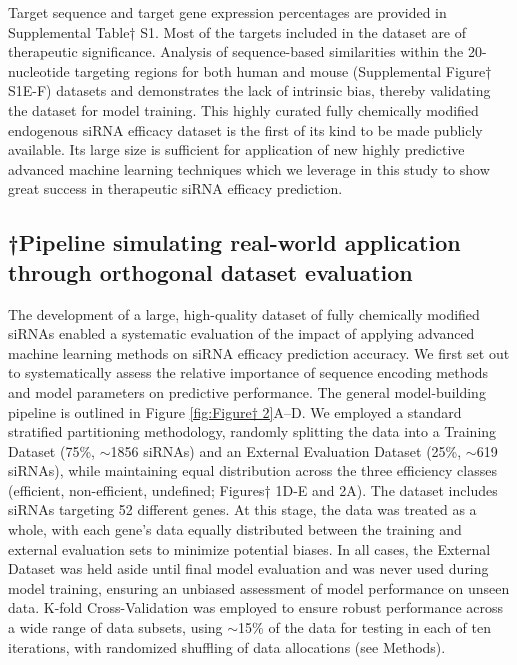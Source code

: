 \documentclass{report}
\begin{document}
Target sequence and target gene expression percentages are provided in Supplemental Table† S1. Most of the targets included in the dataset are of therapeutic significance. Analysis of sequence-based similarities within the 20-nucleotide targeting regions for both human and mouse (Supplemental Figure† S1E-F) datasets and demonstrates the lack of intrinsic bias, thereby validating the dataset for model training. This highly curated fully chemically modified endogenous siRNA efficacy dataset is the first of its kind to be made publicly available. Its large size is sufficient for application of new highly predictive advanced machine learning techniques which we leverage in this study to show great success in therapeutic siRNA efficacy prediction.


\subsection{†Pipeline simulating real-world application through orthogonal dataset evaluation}

The development of a large, high-quality dataset of fully chemically modified siRNAs enabled a systematic evaluation of the impact of applying advanced machine learning methods on siRNA efficacy prediction accuracy. We first set out to systematically assess the relative importance of sequence encoding methods and model parameters on predictive performance. The general model-building pipeline is outlined in Figure \ref{fig:Figure† 2}A–D. We employed a standard stratified partitioning methodology, randomly splitting the data into a Training Dataset (75\%, $\sim$1856 siRNAs) and an External Evaluation Dataset (25\%, $\sim$619 siRNAs), while maintaining equal distribution across the three efficiency classes (efficient, non-efficient, undefined; Figures† 1D-E and 2A). The dataset includes siRNAs targeting 52 different genes. At this stage, the data was treated as a whole, with each gene’s data equally distributed between the training and external evaluation sets to minimize potential biases. In all cases, the External Dataset was held aside until final model evaluation and was never used during model training, ensuring an unbiased assessment of model performance on unseen data. K-fold Cross-Validation was employed to ensure robust performance across a wide range of data subsets, using $\sim$15\% of the data for testing in each of ten iterations, with randomized shuffling of data allocations (see Methods).
\end{document}

